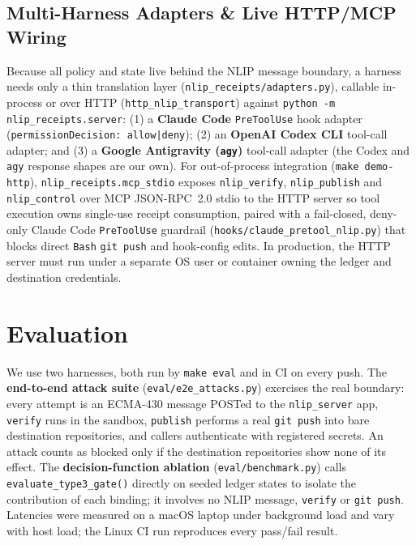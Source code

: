 \documentclass[sigconf,nonacm]{acmart}
\begin{document}
\subsection{Multi-Harness Adapters \& Live HTTP/MCP Wiring}
Because all policy and state live behind the NLIP message boundary, a harness needs only a thin translation layer (\texttt{nlip\_receipts/adapters.py}), callable in-process or over HTTP (\texttt{http\_nlip\_transport}) against \texttt{python -m nlip\_receipts.server}:
(1) a \textbf{Claude Code} \texttt{PreToolUse} hook adapter (\texttt{permissionDecision: allow|deny});
(2) an \textbf{OpenAI Codex CLI} tool-call adapter; and
(3) a \textbf{Google Antigravity (\texttt{agy})} tool-call adapter (the Codex and \texttt{agy} response shapes are our own).
For out-of-process integration (\texttt{make demo-http}), \texttt{nlip\_receipts.mcp\_stdio} exposes \texttt{nlip\_verify}, \texttt{nlip\_publish} and \texttt{nlip\_control} over MCP JSON-RPC~2.0 stdio to the HTTP server so tool execution owns single-use receipt consumption, paired with a fail-closed, deny-only Claude Code \texttt{PreToolUse} guardrail (\texttt{hooks/\allowbreak claude\_pretool\_nlip.py}) that blocks direct \texttt{Bash} \texttt{git push} and hook-config edits. In production, the HTTP server must run under a separate OS user or container owning the ledger and destination credentials.

\section{Evaluation}

We use two harnesses, both run by \texttt{make eval} and in CI on every push. The \textbf{end-to-end attack suite} (\texttt{eval/e2e\_attacks.py}) exercises the real boundary: every attempt is an ECMA-430 message POSTed to the \texttt{nlip\_server} app, \texttt{verify} runs in the sandbox, \texttt{publish} performs a real \texttt{git push} into bare destination repositories, and callers authenticate with registered secrets. An attack counts as blocked only if the destination repositories show none of its effect. The \textbf{decision-function ablation} (\texttt{eval/benchmark.py}) calls \texttt{evaluate\_type3\_gate()} directly on seeded ledger states to isolate the contribution of each binding; it involves no NLIP message, \texttt{verify} or \texttt{git push}. Latencies were measured on a macOS laptop under background load and vary with host load; the Linux CI run reproduces every pass/fail result.
\end{document}
